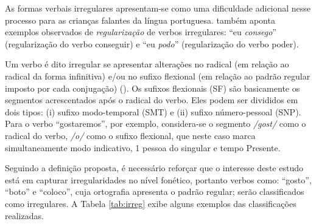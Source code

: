 As formas verbais irregulares apresentam-se como uma dificuldade adicional nesse processo para as crianças falantes da língua portuguesa. \cite{wuerges:2014} também aponta exemplos observados de \textit{regularização} de verbos irregulares: “eu \textit{consego}” (regularização do verbo conseguir) e “eu \textit{podo}” (regularização do verbo poder).

Um verbo é dito irregular se apresentar alterações no radical (em relação ao radical da forma infinitiva) e/ou no sufixo flexional (em relação ao padrão regular imposto por cada conjugação) (\cite{wuerges:2014}). Os sufixos flexionais (SF) são basicamente os segmentos acrescentados após o radical do verbo. Eles podem ser divididos em dois tipos: (i) sufixo modo-temporal (SMT) e (ii) sufixo número-pessoal (SNP). Para o verbo “gostaremos”, por exemplo, considera-se o segmento \textit{/gost/} como o radical do verbo, \textit{/o/} como o sufixo flexional, que neste caso marca simultaneamente modo indicativo, 1 pessoa do singular e tempo Presente.





Seguindo a definição proposta, é necessário reforçar que o interesse deste estudo está em capturar irregularidades no nível fonético, portanto verbos como: “gosto”, “boto” e “coloco”, cuja ortografia apresenta o padrão regular; serão classificados como irregulares. A Tabela \ref{tab:irreg} exibe alguns exemplos das classificações realizadas.

